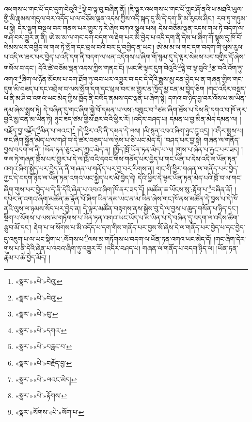 འཕགས་པ་གང་པོ་དང་དུག་བེའུའི་\footnote{«སྣར་»«པེ་»བེའུ་}ལྟེ་བ་ལྟ་བུ་བཞིན་ནོ། །ཇི་ལྟར་འཕགས་པ་གང་པོ་ཀླུང་ཤོ་ནའི་ཕ་མཐའི་ཡུལ་གྱི་མི་རྣམས་གདུལ་བར་འདོད་པ་ལ་བཅོམ་ལྡན་འདས་ཀྱིས་འདི་སྐད་དུ་མི་དེ་དག་ནི་མ་རུངས་ཤིང་། རབ་ཏུ་གཏུམ་པ་སྟེ། དེར་སྡུག་བསྔལ་བར་གནས་པར་གྱུར་ཏ་རེ་ཞེས་བཀའ་སྩལ་པས། དེས་བཅོམ་ལྡན་འདས་གལ་ཏེ་བདག་ལ་གཤེ་བར་གྱུར་ན་ནི། ཨེ་མ་མ་ལ་གང་དག་བདག་ལ་རྡེག་པར་མི་བྱེད་པ་འདི་དག་ནི་དེས་པ་ཞིག་གོ་སྙམ་དུ་ཁོ་བོ་སེམས་པར་བགྱིད་ལ་གལ་ཏེ་སྲོག་དང་བྲལ་བའི་བར་དུ་བགྱིད་ན་ཡང་། ཨེ་མ་མ་ལ་གང་དག་བདག་གི་ལུས་རུལ་པ་འདི་ལ་ཐར་པར་བྱེད་པ་འདི་དག་ནི་བདག་ལ་ཕན་འདོགས་པ་ཞིག་གོ་སྙམ་དུ་དེ་ལྟར་སེམས་པར་བགྱིད་དོ་ཞེས་གསོལ་བ་དང་། དེའི་ཚེ་བཅོམ་ལྡན་འདས་ཀྱིས་གནང་ངོ། །ཡང་ཇི་ལྟར་དུག་བེའུའི་\footnote{«སྣར་»«པེ་»བེའུ་}ལྟེ་བ་ལྟ་བུའི་\footnote{«སྣར་»«པེ་»བུ་}རྩ་བའི་འོག་ཏུ་འགའ་\footnote{«སྣར་»«པེ་»དགའ་}ཞིག་ལ་ཉོན་མོངས་པ་དག་ཐོག་ཏུ་བབ་པར་འགྱུར་བ་དང་དེ་དེའི་རྒྱུས་མྱ་ངན་བྱེད་པ་ན་གཞན་གྱིས་གང་དུག་མི་བཟད་པ་དང་འབྲེལ་བ་ལས་སྲོག་དག་དང་ཕྲལ་བར་མ་གྱུར་ན་ཁྱོད་མྱ་ངན་མ་བྱེད་ཅིག །གང་འདིར་བསྡད་པ་ནི་མ་ཤི་བ་འགའ་ཡང་མེད་ཀྱིས་ཁྱོད་ནི་བསོད་ནམས་དང་ལྡན་པ་ཞིག་སྟེ། དགའ་བ་ཉིད་བྱ་བར་འོས་པ་མ་ཡིན་ནམ་ཞེས་སྨྲས་ཏེ། དེ་བཞིན་དུ་གང་ཞིག་སྐྱེ་བོ་དམན་པ་ལས་:བསླང་བ་\footnote{«སྣར་»«པེ་»བརླང་བ་}ཙམ་ཞིག་ཐོས་པ་དེས་ནི་དགའ་བ་ཁོ་ནར་བྱའི་མྱ་ངན་མ་ཡིན་ཏེ། ཉུང་ཟད་ཙམ་གྱིས་ཐར་བའི་ཕྱིར་རོ། །འདིར་བཤད་པ། དམན་པ་བྱ་མིན་མེད་དམན་ལ། །བརྗོད་བྱ་བརྗོད་\footnote{«སྣར་»«པེ་»བརྗོད་བྱ་}མིན་པ་ལའང་།\footnote{«སྣར་»«པེ་»ལའང་མེད།} །དེ་ཕྱིར་འདི་ནི་དམན་དེ་ལས། །མི་སྙན་འབའ་ཞིག་ཉུང་ངུ་འདྲ། །འདིར་སྨྲས་པ། གང་ཞིག་སྐྱོན་མེད་པ་ལ་གཤེ་བ་དེ་ཚར་བཅད་པ་ལ་ཉེས་པ་ཅི་ཡང་མེད་དོ། །བཤད་པར་བྱ་སྟེ། གཞན་ལ་གནོད་བྱས་བདག་ལ་ནི། །ཡོན་ཏན་ཅུང་ཟད་ཀྱང་མེད་ན། །ཁྱོད་ཁྲོ་ཡོན་ཏན་མེད་པ་ལ། །གུས་པ་ཞེན་པ་རྐྱང་པར་ཟད། །གལ་ཏེ་གཞན་ཁྲོས་པར་གྱུར་པ་དེ་ལ་ཁྲོ་བའི་དབང་གིས་གནོད་པར་བྱེད་པ་གང་ཡིན་པ་དེས་འདི་ལ་ཡོན་ཏན་འགའ་ཞིག་སྐྱེད་པར་བྱེད་ན་ནི་གཞན་ལ་གནོད་པར་བྱ་བར་རིགས་ན། གང་གི་ཕྱིར་གཞན་ལ་གནོད་པར་བྱེད་ཀྱང་དེ་བདག་ཉིད་ལ་ཡོན་ཏན་འགའ་ཡང་སྐྱེད་པར་མི་བྱེད་དེ། དེའི་ཕྱིར་དེ་ལྟར་ཡོན་ཏན་མེད་པའི་ཁྲོ་བ་ལ་གང་ཞིག་གུས་པར་བྱེད་པ་དེ་ནི་དེའི་ཞེན་པ་འབའ་ཞིག་ཁོ་ནར་ཟད་དོ། །མཚོན་ཆ་ཡོངས་སུ་:རྟོག་པ་\footnote{«སྣར་»«པེ་»རྟོགས་}བཞིན་ནོ། །དཔེར་ན་འགའ་ཞིག་མཚོན་ཆ་རྣོན་པོ་ཞིག་ཡིན་ནམ་ཡང་ན་མ་ཡིན་ཞེས་གང་ཁོ་ནས་མཚོན་དེ་བྱས་པ་དེ་ཁོ་ནའི་ལུས་ལ་ཉམས་སོད་པར་བྱེད་ན། དེ་ལྟར་མཚོན་བརྟགས་ནས་སྐྱེས་བུ་དེ་ལ་བྱས་པ་ཆུད་གསོན་པ་ཉིད་དང་། སྡིག་པ་སོགས་པ་ལས་མ་གཏོགས་པ་ཡོན་ཏན་འགའ་ཡང་ཡོད་པ་མ་ཡིན་པ་དེ་བཞིན་དུ་བདག་ལ་འདིས་ཚིག་རྩུབ་མོ་དང་། རྡེག་པ་ལ་སོགས་པ་མི་འདོད་པ་དག་གིས་གནོད་པར་བྱས་སོ་ཞེས་དེ་ལ་གནོད་པར་བྱེད་པ་དང་བྱེད་དུ་འཇུག་པ་ལ་ཡང་སྡིག་པ་:སོགས་པ་\footnote{«སྣར་»སོགས་«པེ་»སོག་པ་}ལས་མ་གཏོགས་པ་བདག་ལ་ཡོན་ཏན་འགའ་ཡང་མེད་དོ། །གང་ཞིག་དེར་གུས་པ་ནི་དེའི་ཞེན་པ་འབའ་ཞིག་ཏུ་འགྱུར་རོ། །འདིར་བཤད་པ། གཞན་ལ་གནོད་པ་བདག་ཉིད་ལ། །ཡོན་ཏན་རྣམ་པ་ཆེ་བྱེད་མོད། །
